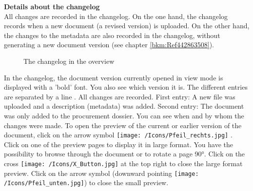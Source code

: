 \vspace{\baselineskip}

\textbf{Details about the changelog} \\
All changes are recorded in the changelog. On the one hand, the changelog records when a new document (a revised version) is uploaded. On the other hand, the changes to the metadata are also recorded in the changelog, without generating a new document version (see chapter \ref{bkm:Ref442863508}).

\begin{figure}[H]
\caption{The changelog in the overview}
\end{figure}

 In the changelog, the document version currently opened in view mode is displayed with a 'bold' font. You also see which version it is. The different entries are separated by a line . All changes are recorded. First entry: A new file was uploaded and a description (metadata) was added. Second entry: The document was only added to the procurement dossier. You can see when and by whom the changes were made. To open the preview of the current or earlier version of the document, click on the arrow symbol \texttt{[image: /Icons/Pfeil\_rechts.jpg]} . Click on one of the preview pages to display it in large format. You have the possibility to browse through the document or to rotate a page 90°. Click on the cross \texttt{[image: /Icons/X\_Button.jpg]} at the top right to close the large format preview. Click on the arrow symbol (downward pointing \texttt{[image: /Icons/Pfeil\_unten.jpg]}) to close the small preview.

